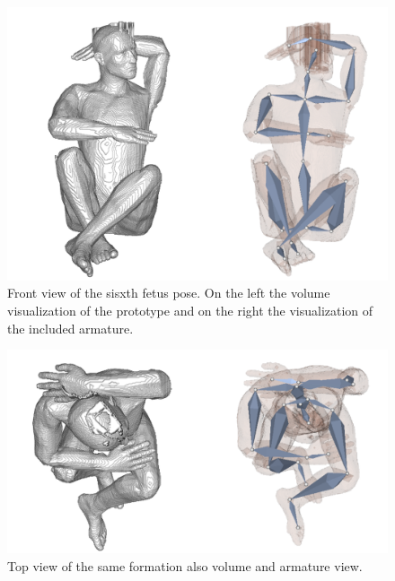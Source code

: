 \newpage
\begin{figure} [htb!]
    \centering
	\includegraphics[width=13cm]{content/images/results/man6Front.png}
	\caption{Front view of the sisxth fetus pose. On the left the volume visualization of the prototype and on the right the visualization of the included armature.}
	\label{fig:}
\end{figure}
\begin{figure} [htb!]
    \centering
	\includegraphics[width=13cm]{content/images/results/man6Top.png}
	\caption{Top view of the same formation also volume and armature view.}
	\label{fig:}
\end{figure}

